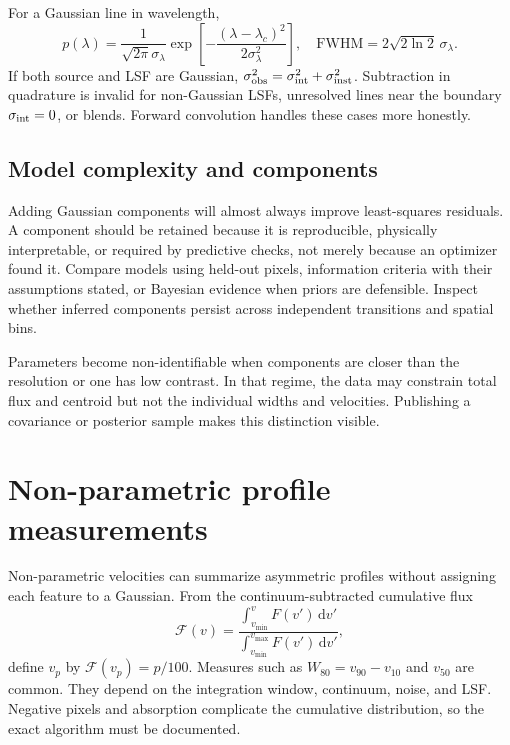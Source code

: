 For a Gaussian line in wavelength,
\begin{equation}
 p(\lambda)=\frac{1}{\sqrt{2\pi}\sigma_\lambda}
 \exp\!\left[-\frac{(\lambda-\lambda_c)^2}{2\sigma_\lambda^2}\right],
 \quad
 \mathrm{FWHM}=2\sqrt{2\ln2}\,\sigma_\lambda.
 \label{eq:gaussian-line-model}
\end{equation}
If both source and LSF are Gaussian,
$\sigma_{\rm obs}^2=\sigma_{\rm int}^2+\sigma_{\rm inst}^2$.  Subtraction in
quadrature is invalid for non-Gaussian LSFs, unresolved lines near the boundary
$\sigma_{\rm int}=0$, or blends.  Forward convolution handles these cases more
honestly.

\subsection{Model complexity and components}

Adding Gaussian components will almost always improve least-squares residuals.  A
component should be retained because it is reproducible, physically interpretable,
or required by predictive checks, not merely because an optimizer found it.  Compare
models using held-out pixels, information criteria with their assumptions stated, or
Bayesian evidence when priors are defensible.  Inspect whether inferred components
persist across independent transitions and spatial bins.

Parameters become non-identifiable when components are closer than the resolution or
one has low contrast.  In that regime, the data may constrain total flux and centroid
but not the individual widths and velocities.  Publishing a covariance or posterior
sample makes this distinction visible.

\section{Non-parametric profile measurements}

Non-parametric velocities can summarize asymmetric profiles without assigning each
feature to a Gaussian.  From the continuum-subtracted cumulative flux
\begin{equation}
 \mathcal{F}(v)=\frac{\int_{v_{\min}}^v F(v')\,\mathrm{d}v'}
 {\int_{v_{\min}}^{v_{\max}}F(v')\,\mathrm{d}v'},
 \label{eq:cumulative-line-flux}
\end{equation}
define $v_p$ by $\mathcal{F}(v_p)=p/100$.  Measures such as
$W_{80}=v_{90}-v_{10}$ and $v_{50}$ are common.  They depend on the integration
window, continuum, noise, and LSF.  Negative pixels and absorption complicate the
cumulative distribution, so the exact algorithm must be documented.

